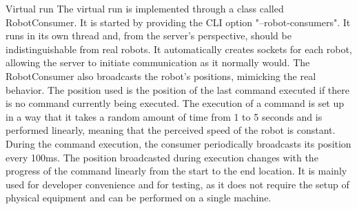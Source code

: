 \secc Virtual run
The virtual run is implemented through a class called RobotConsumer. It is started by providing the CLI option "--robot-consumers". It runs in its own thread and, from the server's perspective, should be indistinguishable from real robots. It automatically creates sockets for each robot, allowing the server to initiate communication as it normally would. The RobotConsumer also broadcasts the robot's positions, mimicking the real behavior. The position used is the position of the last command executed if there is no command currently being executed. The execution of a command is set up in a way that it takes a random amount of time from 1 to 5 seconds and is performed linearly, meaning that the perceived speed of the robot is constant. During the command execution, the consumer periodically broadcasts its position every 100ms. The position broadcasted during execution changes with the progress of the command linearly from the start to the end location.
It is mainly used for developer convenience and for testing, as it does not require the setup of physical equipment and can be performed on a single machine.

